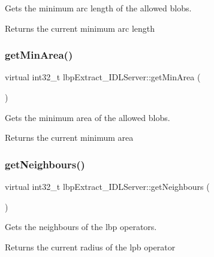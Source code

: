 Gets the minimum arc length of the allowed blobs. 

\begin{DoxyReturn}{Returns}
the current minimum arc length 
\end{DoxyReturn}
\mbox{\label{classlbpExtract__IDLServer_a3f6f2aba33eeb0a15d73fdfc5817ef7a}} 
\subsubsection{\texorpdfstring{get\+Min\+Area()}{getMinArea()}}
{\footnotesize\ttfamily virtual int32\+\_\+t lbp\+Extract\+\_\+\+I\+D\+L\+Server\+::get\+Min\+Area (\begin{DoxyParamCaption}{ }\end{DoxyParamCaption})\hspace{0.3cm}{\ttfamily [virtual]}}



Gets the minimum area of the allowed blobs. 

\begin{DoxyReturn}{Returns}
the current minimum area 
\end{DoxyReturn}
\mbox{\label{classlbpExtract__IDLServer_abf7693b9f3f63c2a16e163a3991b7d01}} 
\subsubsection{\texorpdfstring{get\+Neighbours()}{getNeighbours()}}
{\footnotesize\ttfamily virtual int32\+\_\+t lbp\+Extract\+\_\+\+I\+D\+L\+Server\+::get\+Neighbours (\begin{DoxyParamCaption}{ }\end{DoxyParamCaption})\hspace{0.3cm}{\ttfamily [virtual]}}



Gets the neighbours of the lbp operators. 

\begin{DoxyReturn}{Returns}
the current radius of the lpb operator 
\end{DoxyReturn}
\mbox{\label{classlbpExtract__IDLServer_a48094f72a89aa3218e3449dfe071f0f7}} 
